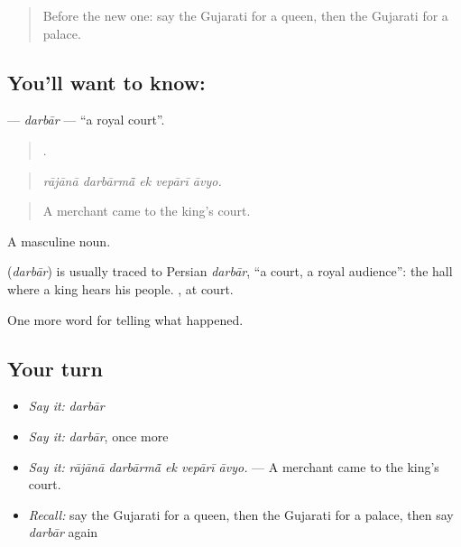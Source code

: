 \label{lesson:GU-C318-darbar}



\begin{quote}
Before the new one: say the Gujarati for a queen, then the Gujarati for a palace.
\end{quote}

\subsection*{You'll want to know: }
\textbf{} — \emph{darbār} — \textquotedblleft{}a royal court\textquotedblright{}.

\begin{quote}
    .
\end{quote}

\begin{quote}
\emph{rājānā darbārmā̃ ek vepārī āvyo.}
\end{quote}

\begin{quote}
A merchant came to the king's court.
\end{quote}

A masculine noun.

\begin{cousinweb}
\textbf{} (\emph{darbār}) is usually traced to Persian \emph{darbār}, \textquotedblleft{}a court, a royal audience\textquotedblright{}: the hall where a king hears his people. \textbf{}, at court.
\end{cousinweb}

\begin{grammarlens}[title={What you've built}]
One more word for telling what happened.
\end{grammarlens}

\subsection*{Your turn}
\begin{itemize}
\raggedright
  \item \emph{Say it:} \emph{darbār}
  \item \emph{Say it:} \emph{darbār}, once more
  \item \emph{Say it:} \emph{rājānā darbārmā̃ ek vepārī āvyo.} — A merchant came to the king's court.
  \item \emph{Recall:} say the Gujarati for a queen, then the Gujarati for a palace, then say \emph{darbār} again
\end{itemize}

